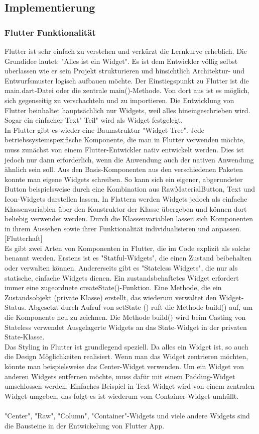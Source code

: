 \subsection{Implementierung}
\subsubsection{Flutter Funktionalität}
Flutter ist sehr einfach zu verstehen und verkürzt die Lernkurve erheblich. Die Grundidee lautet: "Alles ist ein Widget". Es ist dem Entwickler völlig selbst uberlassen wie er sein Projekt
strukturieren und hinsichtlich Architektur- und Entwurfsmuster logisch aufbauen möchte. Der Einstiegspunkt zu Flutter ist die main.dart-Datei oder die zentrale main()-Methode. Von dort aus ist es möglich, sich gegenseitig zu verschachteln und zu importieren. 
Die Entwicklung von Flutter beinhaltet hauptsächlich nur Widgets, weil alles hineingeschrieben wird.
Sogar ein einfacher Text" Teil" wird als Widget festgelegt. 
\\
In Flutter gibt es wieder eine Baumstruktur "Widget Tree". Jede betriebssystemspezifische Komponente, die man in Flutter verwenden möchte, muss zunächst von einem Flutter-Entwickler nativ entwickelt werden. Dies ist jedoch nur dann erforderlich, wenn die Anwendung auch der nativen Anwendung ähnlich sein soll. 
Aus den Basis-Komponenten aus den verschiedenen Paketen konnte man eigene Widgets schreiben. So kann sich ein eigener, abgerundeter Button beispielsweise durch eine Kombination aus RawMaterialButton, Text und Icon-Widgets darstellen lassen.
In Flattern werden Widgets jedoch als einfache Klassenvariablen über den Konstruktor der Klasse übergeben und können dort beliebig verwendet werden.
Durch die Klassenvariablen lassen sich Komponenten in
ihrem Aussehen sowie ihrer Funktionalität individualisieren und anpassen.[Flutterhaft]\\
Es gibt zwei Arten von Komponenten in Flutter, die im Code explizit als solche benannt werden. Erstens ist es "Statful-Widgets", die einen Zustand beibehalten oder verwalten können. Andererseits gibt es "Stateless Widgets", die nur als statische, einfache Widgets dienen. Ein zustandsbehaftetes Widget erfordert immer eine zugeordnete createState()-Funktion. Eine Methode, die ein Zustandsobjekt (private Klasse) erstellt, das wiederum
verwaltet den Widget-Status. Abgesetzt durch Aufruf von setState ()
ruft die Methode build() auf, um die Komponente neu zu zeichnen. Die Methode build() wird beim Casting von Stateless verwendet
Ausgelagerte Widgets an das State-Widget in der privaten State-Klasse.\\
Das Styling in Flutter ist grundlegend speziell. Da alles ein Widget ist, so auch die Design Möglichkeiten realisiert.
Wenn man das Widget zentrieren möchten, könnte man beispielsweise das Center-Widget verwenden.
Um ein Widget von anderen Widgets entfernen möchte, muss dafür mit einem Padding-Widget umschlossen werden. Einfaches Beispiel in Text-Widget wird von einem zentralen Widget umgeben, das folgt
es ist wiederum vom Container-Widget umhüllt.\\\\
"Center", "Raw", "Column", "Container"-Widgets und viele andere Widgets
sind die Bausteine in der Entwickelung von Flutter App.

